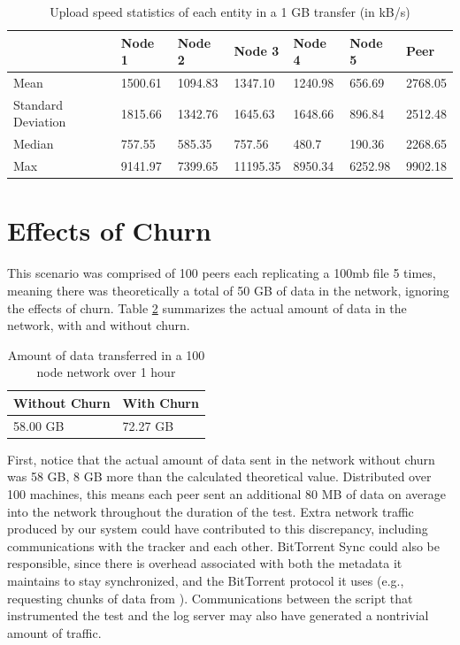 \documentclass[12pt]{report}
\begin{document}
\begin{table}
\begin{adjustwidth}{-.5in}{-.5in}
\centering
    \begin{tabular}{| l | l | l | l | l | l | l |}
    \hline
    & Node 1 & Node 2 & Node 3 & Node 4 & Node 5 & Peer \\ \hline
    Mean & 1500.61 & 1094.83 & 1347.10 & 1240.98 & 656.69 & 2768.05\\ \hline
    Standard Deviation & 1815.66 & 1342.76 & 1645.63 & 1648.66 & 896.84 & 2512.48 \\ \hline
    Median & 757.55 & 585.35 & 757.56 & 480.7 & 190.36 & 2268.65 \\ \hline
    Max & 9141.97 & 7399.65 & 11195.35 & 8950.34 & 6252.98 & 9902.18 \\ \hline
    \end{tabular}
\end{adjustwidth}
    \caption{Upload speed statistics of each entity in a 1 GB transfer (in kB/s) \label{tab:UploadBackupSpeed}}
\end{table}

\section{Effects of Churn} \label{sec:EffectsofChurn_chap:Results}

This scenario was comprised of 100 peers each replicating a 100mb file 5 times, meaning there was theoretically a total of 50 GB of data in the network, ignoring the effects of churn. Table \ref{tab:ChurnBandwidth} summarizes the actual amount of data in the network, with and without churn.

\begin{table}
\begin{center}
    \begin{tabular}{| l | l |}
    \hline
    Without Churn & With Churn \\ \hline
    58.00 GB & 72.27 GB\\ \hline
    \end{tabular}
    \caption{Amount of data transferred in a 100 node network over 1 hour}
    \label{tab:ChurnBandwidth}
\end{center}
\end{table}

First, notice that the actual amount of data sent in the network without churn was 58 GB, 8 GB more than the calculated theoretical value. Distributed over 100 machines, this means each peer sent an additional 80 MB of data on average into the network throughout the duration of the test. Extra network traffic produced by our system could have contributed to this discrepancy, including communications with the tracker and each other. BitTorrent Sync could also be responsible, since there is overhead associated with both the metadata it maintains to stay synchronized, and the BitTorrent protocol it uses (e.g., requesting chunks of data from ). Communications between the script that instrumented the test and the log server may also have generated a nontrivial amount of traffic.
\end{document}
